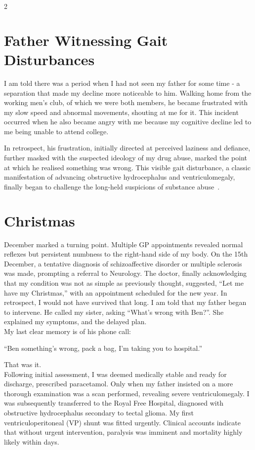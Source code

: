 \documentclass{article}
\begin{document}
\begin{multicols}{2}
\section*{Father Witnessing Gait Disturbances}
I am told there was a period when I had not seen my father for some time - a separation that made my decline more noticeable to him. Walking home from the working men’s club, of which we were both members, he became frustrated with my slow speed and abnormal movements, shouting at me for it. This incident occurred when he also became angry with me because my cognitive decline led to me being unable to attend college.

In retrospect, his frustration, initially directed at perceived laziness and defiance, further masked with the suspected ideology of my drug abuse, marked the point at which he realised something was wrong. This visible gait disturbance, a classic manifestation of advancing obstructive hydrocephalus and ventriculomegaly, finally began to challenge the long-held suspicions of substance abuse~\cite{hammarlund2018,zwick2020,shefer2014,henderson2014}.

\section*{Christmas}
December marked a turning point. Multiple GP appointments revealed normal reflexes but persistent numbness to the right-hand side of my body. On the 15th December, a tentative diagnosis of schizoaffective disorder or multiple sclerosis was made, prompting a referral to Neurology. The doctor, finally acknowledging that my condition was not as simple as previously thought, suggested, ``Let me have my Christmas,'' with an appointment scheduled for the new year. In retrospect, I would not have survived that long. I am told that my father began to intervene. He called my sister, asking “What's wrong with Ben?”. She explained my symptoms, and the delayed plan.
\\
My last clear memory is of his phone call:

\begin{center}
“Ben something’s wrong, pack a bag, I’m taking you to hospital.” 
\end{center}
That was it.
\\
Following initial assessment, I was deemed medically stable and ready for discharge, prescribed paracetamol. Only when my father insisted on a more thorough examination was a scan performed, revealing severe ventriculomegaly. I was subsequently transferred to the Royal Free Hospital, diagnosed with obstructive hydrocephalus secondary to tectal glioma. My first ventriculoperitoneal (VP) shunt was fitted urgently. Clinical accounts indicate that without urgent intervention, paralysis was imminent and mortality highly likely within days.

\end{multicols}
\end{document}
